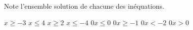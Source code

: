 %
%
    Note l'ensemble solution de chacune des inéquations.
    \begin{tasks}
        \task $x \ge -3$
        \task $x \le 4$
        \task $x \ge 2$
        \task $x \le -4$
        \task $0x \le 0$
        \task $0x \ge -1$
        \task $0x < -2$
        \task $0x > 0$
    \end{tasks}
